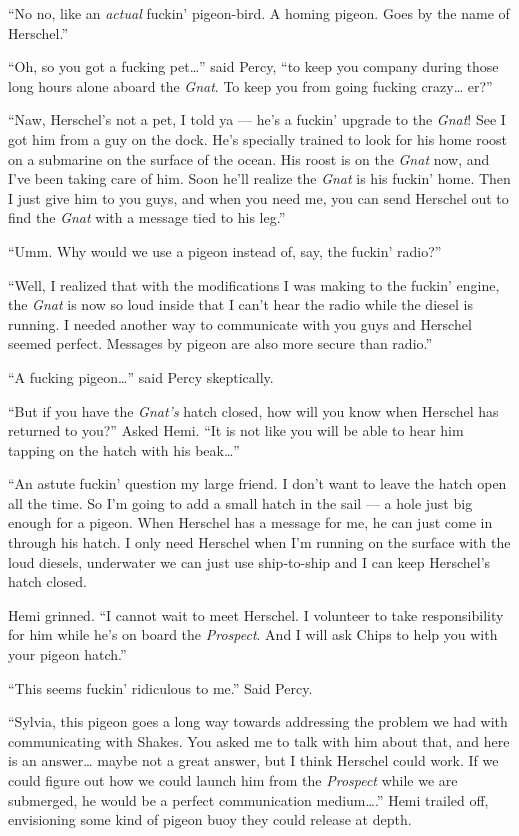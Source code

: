 \documentclass[
]{scrbook}
\begin{document}
``No no, like an \emph{actual} fuckin' pigeon-bird. A homing pigeon.
Goes by the name of Herschel.''

``Oh, so you got a fucking pet\ldots{}'' said Percy, ``to keep you
company during those long hours alone aboard the \emph{Gnat}. To keep
you from going fucking crazy\ldots{} er?''

``Naw, Herschel's not a pet, I told ya --- he's a fuckin' upgrade to the
\emph{Gnat}! See I got him from a guy on the dock. He's specially
trained to look for his home roost on a submarine on the surface of the
ocean. His roost is on the \emph{Gnat} now, and I've been taking care of
him. Soon he'll realize the \emph{Gnat} is his fuckin' home. Then I just
give him to you guys, and when you need me, you can send Herschel out to
find the \emph{Gnat} with a message tied to his leg.''

``Umm. Why would we use a pigeon instead of, say, the fuckin' radio?''

``Well, I realized that with the modifications I was making to the
fuckin' engine, the \emph{Gnat} is now so loud inside that I can't hear
the radio while the diesel is running. I needed another way to
communicate with you guys and Herschel seemed perfect. Messages by
pigeon are also more secure than radio.''

``A fucking pigeon\ldots{}'' said Percy skeptically.

``But if you have the \emph{Gnat's} hatch closed, how will you know when
Herschel has returned to you?'' Asked Hemi. ``It is not like you will be
able to hear him tapping on the hatch with his beak\ldots{}''

``An astute fuckin' question my large friend. I don't want to leave the
hatch open all the time. So I'm going to add a small hatch in the sail
--- a hole just big enough for a pigeon. When Herschel has a message for
me, he can just come in through his hatch. I only need Herschel when I'm
running on the surface with the loud diesels, underwater we can just use
ship-to-ship and I can keep Herschel's hatch closed.

Hemi grinned. ``I cannot wait to meet Herschel. I volunteer to take
responsibility for him while he's on board the \emph{Prospect}. And I
will ask Chips to help you with your pigeon hatch.''

``This seems fuckin' ridiculous to me.'' Said Percy.

``Sylvia, this pigeon goes a long way towards addressing the problem we
had with communicating with Shakes. You asked me to talk with him about
that, and here is an answer\ldots{} maybe not a great answer, but I
think Herschel could work. If we could figure out how we could launch
him from the \emph{Prospect} while we are submerged, he would be a
perfect communication medium\ldots.'' Hemi trailed off, envisioning some
kind of pigeon buoy they could release at depth.
\end{document}

